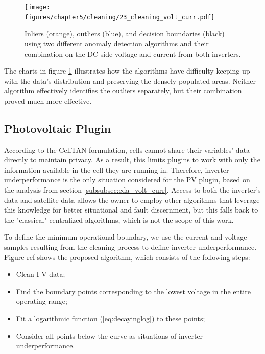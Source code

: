 \begin{figure}[h!]
    \centering
    \texttt{[image: figures/chapter5/cleaning/23\_cleaning\_volt\_curr.pdf]}
    \caption{Inliers (orange), outliers (blue), and decision boundaries (black) using two different anomaly detection algorithms and their combination on the DC side voltage and current from both inverters.}
    \label{fig:clean_volt_curr}
\end{figure}

The charts in figure \ref{fig:clean_volt_curr} illustrates how the algorithms have difficulty keeping up with the data's distribution and preserving the densely populated areas. Neither algorithm effectively identifies the outliers separately, but their combination proved much more effective.

\subsection{Photovoltaic Plugin}

According to the CellTAN formulation, cells cannot share their variables' data directly to maintain privacy. As a result, this limits plugins to work with only the information available in the cell they are running in. Therefore, inverter underperformance is the only situation considered for the PV plugin, based on the analysis from section \ref{subsubsec:eda_volt_curr}. Access to both the inverter's data and satellite data allows the owner to employ other algorithms that leverage this knowledge for better situational and fault discernment, but this falls back to the "classical" centralized algorithms, which is not the scope of this work.

To define the minimum operational boundary, we use the current and voltage samples resulting from the cleaning process to define inverter underperformance. Figure ref shows the proposed algorithm, which consists of the following steps:

\begin{itemize}
	\item Clean I-V data;
	\item Find the boundary points corresponding to the lowest voltage in the entire operating range;
	\item Fit a logarithmic function (\ref{eq:decayinglog}) to these points;
	\item Consider all points below the curve as situations of inverter underperformance.
\end{itemize}


